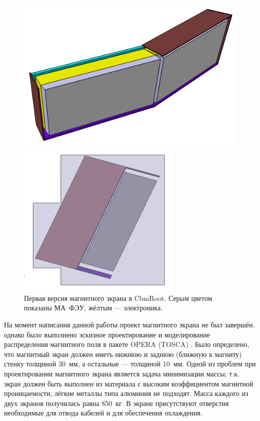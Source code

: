 \begin{figure}[H]
\begin{minipage}[b]{0.495\textwidth}
\includegraphics[width=1.0\textwidth]{pictures/ShieldingBox_MC.png}
\end{minipage}
\hspace{0.01\textwidth}
\begin{minipage}[b]{0.495\textwidth}
\includegraphics[width=0.7\textwidth]{pictures/ShieldingBox_MC2.png}
\end{minipage}
\caption{Первая версия магнитного экрана в CbmRoot. Серым цветом показаны МА~ФЭУ, жёлтым --- электроника.}
\label{fig:ShieldingBoxMC}
\end{figure}

На момент написания данной работы проект магнитного экрана не был завершён, однако было выполнено эскизное проектирование и моделирование распределения магнитного поля в пакете OPERA (TOSCA) \todo. Было определено, что магнитный экран должен иметь нижнюю и заднюю (ближную к магниту) стенку толщиной 30~мм, а остальные --- толщиной 10~мм. Одной из проблем при проектировании магнитного экрана является задача минимизации массы; т.к. экран должен быть выполнен из материала с высоким коэффициентом магнитной проницаемости, лёгкие металлы типа алюминия не подходят. Масса каждого из двух экранов получилась равна 850~кг. В экране присутствуют отверстия необходимые для отвода кабелей и для обеспечения охлаждения.


